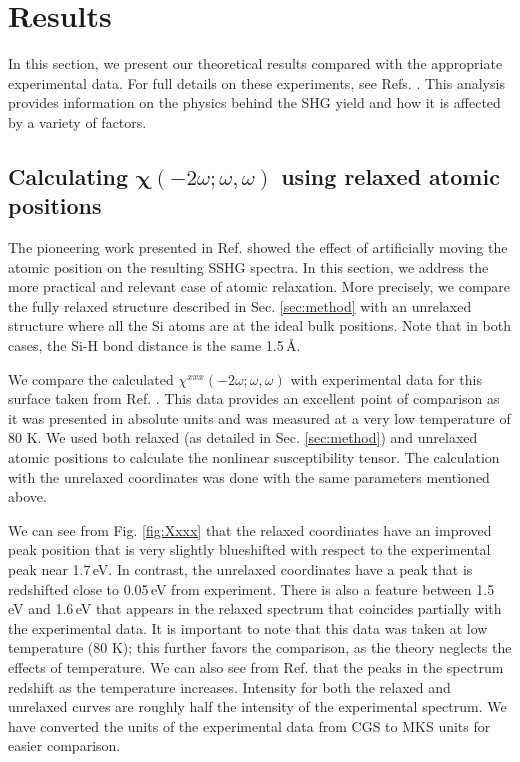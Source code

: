 \documentclass[prb,superscriptaddress,showpacs,twocolumn,letterpaper]{revtex4}
\begin{document}
\section{Results}\label{sec:results}

In this section, we present our theoretical results compared with the
appropriate experimental data. For full details on these experiments, see Refs.
. This analysis
provides information on the physics behind the SHG yield and how it is affected
by a variety of factors.


\subsection{Calculating
\texorpdfstring{$\boldsymbol{\chi}(-2\omega;\omega,\omega)$}{X(-2w;w,w)} using
relaxed atomic positions}\label{sec:relaxed}

The pioneering work presented in Ref.  showed the effect
of artificially moving the atomic position on the resulting SSHG spectra. In
this section, we address the more practical and relevant case of atomic
relaxation. More precisely, we compare the fully relaxed structure described in
Sec. \ref{sec:method} with an unrelaxed structure where all the Si atoms are at
the ideal bulk positions. Note that in both cases, the Si-H bond distance is the
same 1.5\,\AA.

We compare the calculated $\chi^{xxx}(-2\omega;\omega,\omega)$ with experimental
data for this surface taken from Ref. . This data
provides an excellent point of comparison as it was presented in absolute units
and was measured at a very low temperature of 80 K. We used both relaxed (as
detailed in Sec. \ref{sec:method}) and unrelaxed atomic positions to calculate
the nonlinear susceptibility tensor. The calculation with the unrelaxed
coordinates was done with the same parameters mentioned above.

We can see from Fig. \ref{fig:Xxxx} that the relaxed coordinates have an
improved peak position that is very slightly blueshifted with respect to the
experimental peak near 1.7\,eV. In contrast, the unrelaxed coordinates have a
peak that is redshifted close to 0.05\,eV from experiment. There is also a
feature between 1.5\,eV and 1.6\,eV that appears in the relaxed spectrum that
coincides partially with the experimental data. It is important to note that
this data was taken at low temperature (80 K); this further favors the
comparison, as the theory neglects the effects of temperature. We can also see
from Ref.  that the peaks in the spectrum redshift as
the temperature increases. Intensity for both the relaxed and unrelaxed curves
are roughly half the intensity of the experimental spectrum. We have converted
the units of the experimental data from CGS to MKS units for easier comparison.
\end{document}
